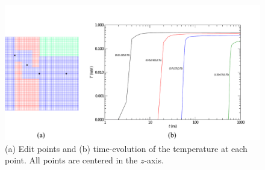 \documentclass[preprint,12pt]{elsarticle}
\begin{document}
\begin{figure}[ht!]
  \begin{center}
    \includegraphics[width=5in,clip]{edit_points.pdf}
  \end{center}
  \caption{(a) Edit points and (b) time-evolution of the temperature at each
    point.  All points are centered in the $z$-axis.}
  \label{fig:edit-points}
\end{figure}
\end{document}
